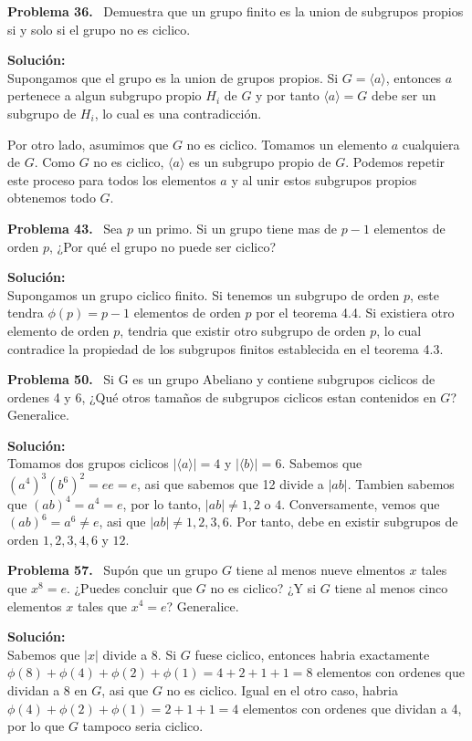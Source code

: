 \documentclass{article}
\newcounter{problem}
\newcounter{solution}
\newcommand\Problem[1]{%
  \stepcounter{problem}%
  \textbf{Problema #1.}~%
  \setcounter{solution}{0}%
}
\newcommand\TheSolution{%
  \textbf{Solución:}\\%
}
\begin{document}
\Problem{36} Demuestra que un grupo finito es la union de subgrupos propios si
y solo si el grupo no es ciclico.

\TheSolution{}
Supongamos que el grupo es la union de grupos propios. Si $G = \langle
a\rangle$, entonces $a$ pertenece a algun subgrupo propio $H_i$ de $G$ y
por tanto $\langle a \rangle = G$ debe ser un subgrupo de $H_i$, lo cual es
una contradicción.

Por otro lado, asumimos que $G$ no es ciclico. Tomamos un elemento $a$
cualquiera de $G$. Como $G$ no es ciclico, $\langle a \rangle$ es un subgrupo
propio de $G$. Podemos repetir este proceso para todos los elementos $a$ y
al unir estos subgrupos propios obtenemos todo $G$.

\Problem{43} Sea $p$ un primo. Si un grupo tiene mas de $p - 1$ elementos de
orden $p$, ¿Por qué el grupo no puede ser ciclico?

\TheSolution{}
Supongamos un grupo ciclico finito. Si tenemos un subgrupo de orden
$p$, este tendra $\phi(p) = p - 1$ elementos de orden $p$ por el teorema 4.4.
Si existiera otro elemento de orden $p$, tendria que existir otro subgrupo de
orden $p$, lo cual contradice la propiedad de los subgrupos finitos
establecida en el teorema 4.3.

\Problem{50} Si G es un grupo Abeliano y contiene subgrupos ciclicos de
ordenes 4 y 6, ¿Qué otros tamaños de subgrupos ciclicos estan contenidos en
$G$? Generalice.

\TheSolution{} Tomamos dos grupos ciclicos $|\langle a \rangle| = 4$ y
$|\langle b\rangle| = 6$. Sabemos que ${(a^4)}^{3}{(b^6)}^2 = ee = e$, asi que
sabemos que 12 divide a $|ab|$. Tambien sabemos que ${(ab)}^{4} = a^4 = e$,
por lo tanto, $|ab| \neq 1, 2$ o $4$. Conversamente, vemos que ${(ab)}^{6} =
a^{6} \neq e$, asi que $|ab| \neq 1, 2, 3, 6$. Por tanto, debe en existir
subgrupos de orden $1, 2, 3, 4, 6$ y $12$.

\Problem{57} Supón que un grupo $G$ tiene al menos nueve elmentos $x$ tales
que $x^8 = e$. ¿Puedes concluir que $G$ no es ciclico? ¿Y si $G$ tiene al
menos cinco elementos $x$ tales que $x^4 = e$? Generalice.

\TheSolution{} Sabemos que $|x|$ divide a $8$. Si $G$ fuese ciclico, entonces
habria exactamente $\phi(8) + \phi(4) + \phi(2) + \phi(1) = 4 + 2 + 1 + 1 = 8$
elementos con ordenes que dividan a $8$ en $G$, asi que $G$ no es ciclico.
Igual en el otro caso, habria $\phi(4) + \phi(2) + \phi(1) = 2 + 1 + 1 = 4$
elementos con ordenes que dividan a 4, por lo que $G$ tampoco seria ciclico.
\end{document}
